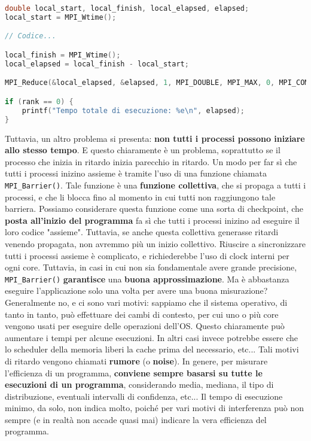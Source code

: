 \begin{codeblock}
    \begin{lstlisting}[language = C]
double local_start, local_finish, local_elapsed, elapsed;
local_start = MPI_Wtime();

// Codice...

local_finish = MPI_Wtime();
local_elapsed = local_finish - local_start;

MPI_Reduce(&local_elapsed, &elapsed, 1, MPI_DOUBLE, MPI_MAX, 0, MPI_COMM_WORLD);

if (rank == 0) {
    printf("Tempo totale di esecuzione: %e\n", elapsed);
}\end{lstlisting}
\end{codeblock}

Tuttavia, un altro problema si presenta: \textbf{non tutti i processi possono iniziare allo stesso tempo}. E questo chiaramente è un problema, soprattutto se il processo che inizia in ritardo inizia parecchio in ritardo. Un modo per far sì che tutti i processi inizino assieme è tramite l'uso di una funzione chiamata \verb|MPI_Barrier()|. Tale funzione è una \textbf{funzione collettiva}, che si propaga a tutti i processi, e che li blocca fino al momento in cui tutti non raggiungono tale barriera. Possiamo considerare questa funzione come una sorta di checkpoint, che \textbf{posta all'inizio del programma} fa sì che tutti i processi inizino ad eseguire il loro codice "assieme".
\nl
Tuttavia, se anche questa collettiva generasse ritardi venendo propagata, non avremmo più un inizio collettivo. Riuscire a sincronizzare tutti i processi assieme è complicato, e richiederebbe l'uso di clock interni per ogni core. Tuttavia, in casi in cui non sia fondamentale avere grande precisione, \verb|MPI_Barrier()| \textbf{garantisce} una \textbf{buona approssimazione}.
\nl
Ma è abbastanza eseguire l'applicazione solo una volta per avere una buona misurazione? Generalmente no, e ci sono vari motivi: sappiamo che il sistema operativo, di tanto in tanto, può effettuare dei cambi di contesto, per cui uno o più core vengono usati per eseguire delle operazioni dell'OS. Questo chiaramente può aumentare i tempi per alcune esecuzioni. In altri casi invece potrebbe essere che lo scheduler della memoria liberi la cache prima del necessario, etc...
\nl
Tali motivi di ritardo vengono chiamati \textbf{rumore} (o \textbf{noise}). In genere, per misurare l'efficienza di un programma, \textbf{conviene sempre basarsi su tutte le esecuzioni di un programma}, considerando media, mediana, il tipo di distribuzione, eventuali intervalli di confidenza, etc... Il tempo di esecuzione minimo, da solo, non indica molto, poiché per vari motivi di interferenza può non sempre (e in realtà non accade quasi mai) indicare la vera efficienza del programma.

